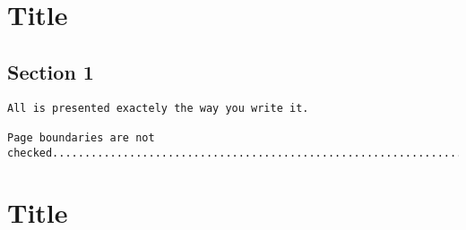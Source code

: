 
\chapter{\label{appendixA}Title}


\section{\label{chapterA:section1}Section 1}

\begin{verbatim}
All is presented exactely the way you write it.

Page boundaries are not checked.....................................................................................

\end{verbatim}

\chapter{\label{appendixB}Title}


%
%
\printnomenclature



